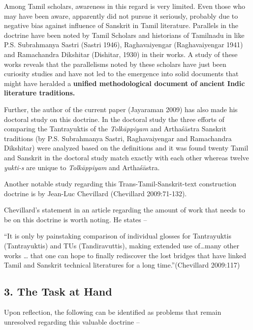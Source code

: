 Among Tamil scholars, awareness in this regard is very limited. Even those who may have been aware, apparently did not pursue it seriously, probably due to negative bias against influence of Sanskrit in Tamil literature. Parallels in the doctrine have been noted by Tamil Scholars and historians of Tamilnadu in like P.S. Subrahmanya Sastri (Sastri 1946), Raghavaiyengar (Raghavaiyengar 1941) and Ramachandra Dikshitar (Dishitar, 1930) in their works. A study of these works reveals that the parallelisms noted by these scholars have just been curiosity studies and have not led to the emergence into solid documents that might have heralded a \textbf{unified methodological document of ancient Indic literature traditions.}

Further, the author of the current paper (Jayaraman 2009) has also made his doctoral study on this doctrine. In the doctoral study the three efforts of comparing the Tantrayuktis of the \textit{Tolkāppiyam} and Arthaśāstra Sanskrit traditions (by P.S. Subrahmanya Sastri, Raghavaiyengar and Ramachandra Dikshitar) were analyzed based on the definitions and it was found twenty Tamil and Sanskrit in the doctoral study match exactly with each other whereas twelve \textit{yukti-s} are unique to \textit{Tolkāppiyam} and Arthaśāstra.

Another notable study regarding this Trans-Tamil-Sanskrit-text construction doctrine is by Jean-Luc Chevillard (Chevillard 2009:71-132).

Chevillard’s statement in an article regarding the amount of work that needs to be on this doctrine is worth noting. He states –

\begin{myquote}
“It is only by painstaking comparison of individual glosses for Tantrayuktis (Tantrayuktis) and TUs (Tandiravuttis), making extended use of…many other works … that one can hope to finally rediscover the lost bridges that have linked Tamil and Sanskrit technical literatures for a long time.”\hfill (Chevillard 2009:117)
\end{myquote}


\subsection*{3. The Task at Hand}

Upon reflection, the following can be identified as problems that remain unresolved regarding this valuable doctrine –

